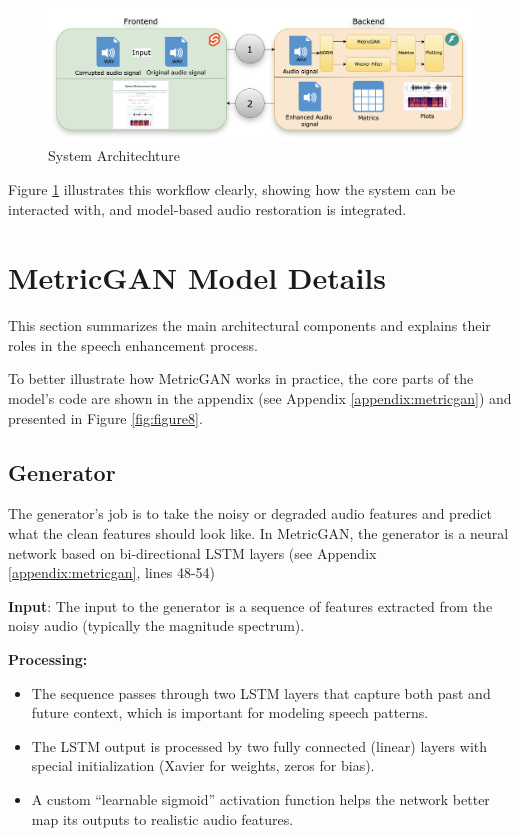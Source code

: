 \begin{figure}[htbp]
    \centering
    \includegraphics[width=1\linewidth]{figures/sysarch.png}
     \caption{System Architechture}
    \label{fig:figure7}
\end{figure}

Figure \ref{fig:figure7}  illustrates this workflow clearly, showing how the system can be interacted with, and model-based audio restoration is integrated.

\section{MetricGAN Model Details}
 This section summarizes the main architectural components and explains their roles in the speech enhancement process.
 
To better illustrate how MetricGAN works in practice, the core parts of the model’s code are shown in the appendix (see Appendix \ref{appendix:metricgan}) and presented in Figure \ref{fig:figure8}.

\subsection{Generator}
The generator’s job is to take the noisy or degraded audio features and predict what the clean features should look like. In MetricGAN, the generator is a neural network based on bi-directional LSTM layers (see Appendix \ref{appendix:metricgan}, lines 48-54)

\textbf{Input}: The input to the generator is a sequence of features extracted from the noisy audio (typically the magnitude spectrum).

\textbf{Processing:}

\begin{itemize}
    \item The sequence passes through two LSTM layers that capture both past and future context, which is important for modeling speech patterns.
    \item The LSTM output is processed by two fully connected (linear) layers with special initialization (Xavier for weights, zeros for bias).
    \item A custom “learnable sigmoid” activation function helps the network better map its outputs to realistic audio features.
\end{itemize}

